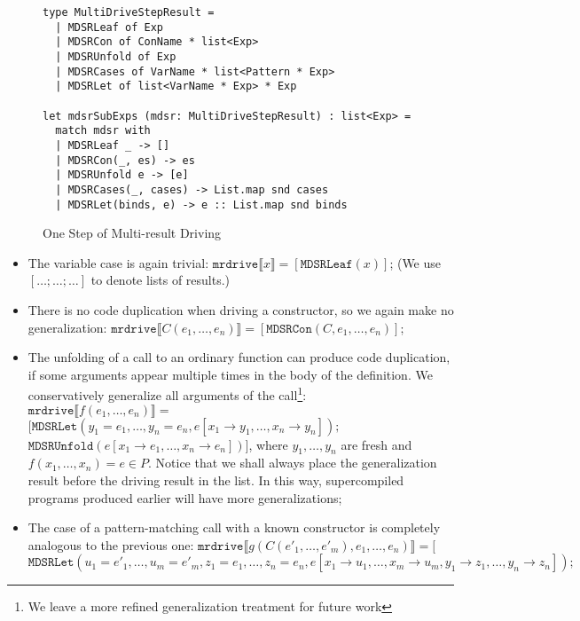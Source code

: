 \documentclass[submission,copyright,creativecommons]{eptcs}
\begin{document}
\begin{figure}
\begin{lstlisting}
type MultiDriveStepResult =
  | MDSRLeaf of Exp
  | MDSRCon of ConName * list<Exp>
  | MDSRUnfold of Exp
  | MDSRCases of VarName * list<Pattern * Exp>
  | MDSRLet of list<VarName * Exp> * Exp

let mdsrSubExps (mdsr: MultiDriveStepResult) : list<Exp> =
  match mdsr with
  | MDSRLeaf _ -> []
  | MDSRCon(_, es) -> es
  | MDSRUnfold e -> [e]
  | MDSRCases(_, cases) -> List.map snd cases
  | MDSRLet(binds, e) -> e :: List.map snd binds
\end{lstlisting}
\caption{One Step of Multi-result Driving}
\label{fig:MultiDriveStepResult}
\end{figure}

\begin{itemize}
  \item The variable case is again trivial: $\mathtt{mrdrive} \llbracket x \rrbracket = [\mathtt{MDSRLeaf}(x)]$;
    (We use $[\ldots; \ldots; \ldots]$ to denote lists of results.)
  \item There is no code duplication when driving a constructor, so we again make no generalization: 
    $\mathtt{mrdrive} \llbracket C(e_1, \ldots, e_n) \rrbracket = [\mathtt{MDSRCon}(C, e_1, \ldots, e_n)]$;
  \item The unfolding of a call to an ordinary function can produce code duplication, if some arguments appear
    multiple times in the body of the definition. 
    We conservatively generalize all arguments of the call\footnote{We leave a more refined generalization treatment for future work}:
    $\mathtt{mrdrive} \llbracket f(e_1, \ldots, e_n) \rrbracket =$ 
      $[\mathtt{MDSRLet}(y_1=e_1, \ldots, y_n=e_n, e [ x_1\rightarrow y_1, \ldots, x_n\rightarrow y_n ]); $
      $\mathtt{MDSRUnfold}(e [ x_1\rightarrow e_1, \ldots, x_n\rightarrow e_n ])]$,
    where $y_1, \ldots, y_n$ are fresh and $f(x_1, \ldots, x_n) = e \in P$.
    Notice that we shall always place the generalization result before the driving result in the list.
    In this way, supercompiled programs produced earlier will have more generalizations;
  \item The case of a pattern-matching call with a known constructor is completely
    analogous to the previous one:
    $\mathtt{mrdrive} \llbracket g(C(e'_1, \ldots, e'_m), e_1, \ldots, e_n) \rrbracket = [$
    $\mathtt{MDSRLet}(u_1=e'_1, \ldots, u_m=e'_m, z_1=e_1, \ldots, z_n=e_n, e [ x_1\rightarrow u_1, \ldots, x_m\rightarrow u_m, y_1 \rightarrow z_1, \ldots, y_n \rightarrow z_n ]);$

\end{itemize}
\end{document}
